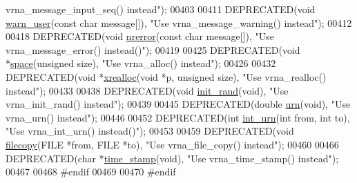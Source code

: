 \begin{DoxyCode}
{       vrna\_message\_input\_seq() instead"});
00403 
00411 DEPRECATED(\textcolor{keywordtype}{void} \hyperlink{utils_8h_af2355fa8746f2f30fbe71db65dea3d51}{warn\_user}(\textcolor{keyword}{const} \textcolor{keywordtype}{char} message[]), \textcolor{stringliteral}{"Use vrna\_message\_warning() instead"});
00412 
00418 DEPRECATED(\textcolor{keywordtype}{void} \hyperlink{utils_8h_a127ce946e56b5a5773781cabe68e38c5}{nrerror}(\textcolor{keyword}{const} \textcolor{keywordtype}{char} message[]), \textcolor{stringliteral}{"Use vrna\_message\_error() instead()"});
00419 
00425 DEPRECATED(\textcolor{keywordtype}{void} *\hyperlink{utils_8h_ad7e1e137b3bf1f7108933d302a7f0177}{space}(\textcolor{keywordtype}{unsigned} size), \textcolor{stringliteral}{"Use vrna\_alloc() instead"});
00426 
00432 DEPRECATED(\textcolor{keywordtype}{void} *\hyperlink{utils_8h_a9037ada838835b1b9db41581a021b0c8}{xrealloc}(\textcolor{keywordtype}{void} *p, \textcolor{keywordtype}{unsigned} size), \textcolor{stringliteral}{"Use vrna\_realloc() instead"});
00433 
00438 DEPRECATED(\textcolor{keywordtype}{void} \hyperlink{utils_8h_a8aaa6d9be6f803f496d9b97375c371f3}{init\_rand}(\textcolor{keywordtype}{void}), \textcolor{stringliteral}{"Use vrna\_init\_rand() instead"});
00439 
00445 DEPRECATED(\textcolor{keywordtype}{double} \hyperlink{utils_8h_aaa328491c84996e445d027fde9800f2e}{urn}(\textcolor{keywordtype}{void}), \textcolor{stringliteral}{"Use vrna\_urn() instead"});
00446 
00452 DEPRECATED(\textcolor{keywordtype}{int} \hyperlink{utils_8h_a68ff0849d44f62fe491800378a5ffcb4}{int\_urn}(\textcolor{keywordtype}{int} from, \textcolor{keywordtype}{int} to), \textcolor{stringliteral}{"Use vrna\_int\_urn() instead()"});
00453 
00459 DEPRECATED(\textcolor{keywordtype}{void} \hyperlink{utils_8h_ab213334ce977b6d21611cdea6b80c3bf}{filecopy}(FILE *from, FILE *to), \textcolor{stringliteral}{"Use vrna\_file\_copy() instead"});
00460 
00466 DEPRECATED(\textcolor{keywordtype}{char} *\hyperlink{utils_8h_a7afeb906cb36e9d77379eabc6907ac46}{time\_stamp}(\textcolor{keywordtype}{void}), \textcolor{stringliteral}{"Use vrna\_time\_stamp() instead"});
00467 
00468 \textcolor{preprocessor}{#endif}
00469 
00470 \textcolor{preprocessor}{#endif}
\end{DoxyCode}
